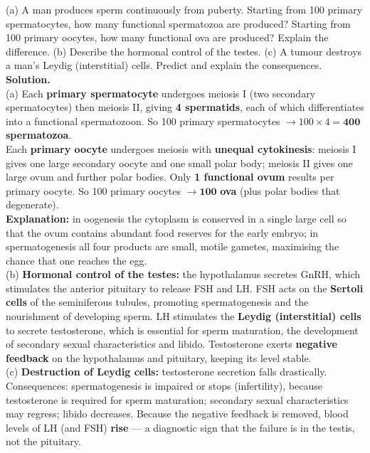\documentclass[11pt]{article}
\newcommand{\cle}[1]{{\popxbold\color{popdark}#1}}
\begin{document}
\begin{exoresolu}
(a) A man produces sperm continuously from puberty. Starting from 100 primary spermatocytes, how many functional spermatozoa are produced? Starting from 100 primary oocytes, how many functional ova are produced? Explain the difference. (b) Describe the hormonal control of the testes. (c) A tumour destroys a man's Leydig (interstitial) cells. Predict and explain the consequences.
\tcblower
\textbf{Solution.}\\
(a) Each \textbf{primary spermatocyte} undergoes meiosis I (two secondary spermatocytes) then meiosis II, giving \textbf{4 spermatids}, each of which differentiates into a functional spermatozoon. So 100 primary spermatocytes $\to 100 \times 4 = \mathbf{400}$ \textbf{spermatozoa}.\\
Each \textbf{primary oocyte} undergoes meiosis with \textbf{unequal cytokinesis}: meiosis I gives one large secondary oocyte and one small polar body; meiosis II gives one large ovum and further polar bodies. Only \textbf{1 functional ovum} results per primary oocyte. So 100 primary oocytes $\to \mathbf{100}$ \textbf{ova} (plus polar bodies that degenerate).\\
\textbf{Explanation:} in oogenesis the cytoplasm is conserved in a single large cell so that the ovum contains abundant food reserves for the early embryo; in spermatogenesis all four products are small, motile gametes, maximising the chance that one reaches the egg.\\
(b) \textbf{Hormonal control of the testes:} the hypothalamus secretes \cle{GnRH}, which stimulates the anterior pituitary to release \cle{FSH} and \cle{LH}. FSH acts on the \textbf{Sertoli cells} of the seminiferous tubules, promoting spermatogenesis and the nourishment of developing sperm. LH stimulates the \textbf{Leydig (interstitial) cells} to secrete \cle{testosterone}, which is essential for sperm maturation, the development of secondary sexual characteristics and libido. Testosterone exerts \textbf{negative feedback} on the hypothalamus and pituitary, keeping its level stable.\\
(c) \textbf{Destruction of Leydig cells:} testosterone secretion falls drastically. Consequences: spermatogenesis is impaired or stops (infertility), because testosterone is required for sperm maturation; secondary sexual characteristics may regress; libido decreases. Because the negative feedback is removed, blood levels of LH (and FSH) \textbf{rise} — a diagnostic sign that the failure is in the testis, not the pituitary.
\end{exoresolu}
\end{document}
